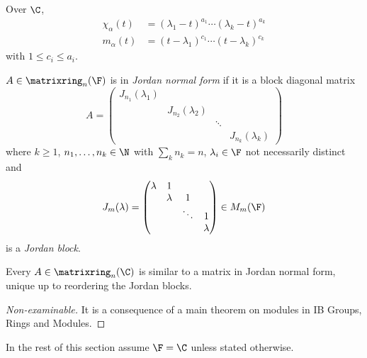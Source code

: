 \documentclass[a4paper]{article}
\newcommand*{\M}{\matrixring}
\theoremstyle{definition}
\begin{document}
\begin{remark}
  Over \(\C\),
  \begin{align*}
    \chi_\alpha(t) &= (\lambda_1 - t)^{a_1} \cdots (\lambda_k - t)^{a_k} \\
    m_\alpha(t) &= (t - \lambda_1)^{c_1} \cdots (t - \lambda_k)^{c_k}
  \end{align*}
  with \(1 \leq c_i \leq a_i\).
\end{remark}

\begin{definition}
  \(A \in \M_n(\F)\) is in \emph{Jordan normal form} if it is a block diagonal matrix
  \[
    A =
    \begin{pmatrix}
      J_{n_1}(\lambda_1) & & & \\
      & J_{n_2}(\lambda_2) & & \\
      & & \ddots & \\
      & & & J_{n_k}(\lambda_k)
    \end{pmatrix}
  \]
  where \(k \geq 1\), \(n_1, \dots, n_k \in \N\) with \(\sum_k n_k = n\), \(\lambda_i \in \F\) not necessarily distinct and
  \[
    J_m(\lambda) =
    \begin{pmatrix}
      \lambda & 1 & & \\
      & \lambda & 1 & \\
      & & \ddots & 1 \\
      & & & \lambda
    \end{pmatrix}
    \in M_m(\F)
  \]
  is a \emph{Jordan block}.
\end{definition}

\begin{theorem}
  \label{thm:jordan normal form}
  Every \(A \in \M_n(\C)\) is similar to a matrix in Jordan normal form, unique up to reordering the Jordan blocks.
\end{theorem}

\begin{proof}[Non-examinable]
  It is a consequence of a main theorem on modules in IB Groups, Rings and Modules.
\end{proof}

In the rest of this section assume \(\F = \C\) unless stated otherwise.
\end{document}
